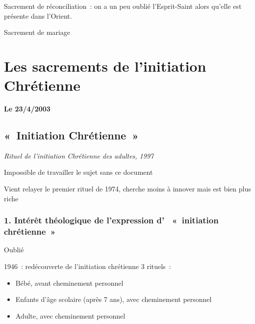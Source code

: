 Sacrement de réconciliation~: on a un peu oublié l'Esprit-Saint alors
qu'elle est présente dans l'Orient.

Sacrement de mariage

\chapter{Les sacrements de l'initiation Chrétienne}


\textbf{Le 23/4/2003}



\hypertarget{initiation-chruxe9tienne}{%
\section{«~Initiation Chrétienne~»}\label{initiation-chruxe9tienne}}

\emph{Rituel de l'initiation Chrétienne des adultes, 1997}

Impossible de travailler le sujet sans ce document

Vient relayer le premier rituel de 1974, cherche moins à innover mais
est bien plus riche

\hypertarget{intuxe9ruxeat-thuxe9ologique-de-lexpression-d-initiation-chruxe9tienne}{%
\subsection{1. Intérêt théologique de l'expression d'~ «~initiation
chrétienne~»}\label{intuxe9ruxeat-thuxe9ologique-de-lexpression-d-initiation-chruxe9tienne}}

Oublié

1946~: redécouverte de l'initiation chrétienne
 3 rituels~:
\begin{itemize}

 
\item
  Bébé, avant cheminement personnel

\item
  Enfants d'âge scolaire (après 7 ans), avec cheminement personnel
 
\item
  Adulte, avec cheminement personnel

\end{itemize}

